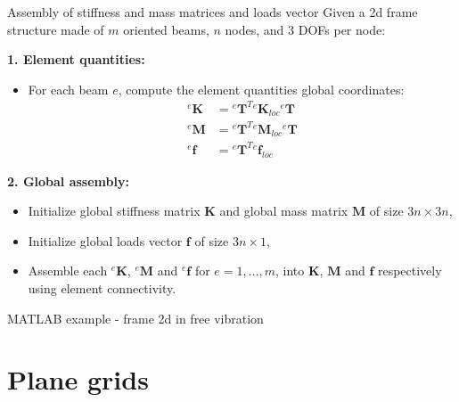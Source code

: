 \documentclass[aspectratio=169]{beamer}
\begin{document}
{
\color{white}
\begin{frame}{Assembly of stiffness and mass matrices and loads vector}
  Given a 2d frame structure made of $m$ oriented beams, $n$ nodes, and $3$ DOFs per node:

  \vspace{0.5em}
  \textbf{1. Element quantities:}
  \begin{itemize}
    \item For each beam $e$, compute the element quantities global coordinates:
          \begin{align*}
            {}^e\mathbf{K} & ={}^e\mathbf{T}^{T} {}^e\mathbf{K}_{loc}{}^e\mathbf{T} \\
            {}^e\mathbf{M} & ={}^e\mathbf{T}^{T} {}^e\mathbf{M}_{loc}{}^e\mathbf{T} \\
            {}^e\mathbf{f} & ={}^e\mathbf{T}^{T} {}^e\mathbf{f}_{loc}
          \end{align*}
  \end{itemize}

  \vspace{0.5em}
  \textbf{2. Global assembly:}
  \begin{itemize}
    \item Initialize global stiffness matrix $\mathbf{K}$ and global mass matrix $\mathbf{M}$ of size $3n \times 3n$,
    \item  Initialize global loads vector $\mathbf{f}$ of size $3n \times 1$,
    \item Assemble each ${}^e\mathbf{K}$, ${}^e\mathbf{M}$ and ${}^e\mathbf{f}$ for $e=1,\dots,m$, into $\mathbf{K}$, $\mathbf{M}$ and $\mathbf{f}$ respectively using element connectivity.
  \end{itemize}
\end{frame}
}

\begin{frame}{MATLAB example - frame 2d in free vibration}
  \begin{center}
    \href{https://drive.mathworks.com/sharing/6a9792ef-d0a7-4aca-a1d0-8b1862b0ac3b}{}
  \end{center}
\end{frame}

\section{Plane grids}
\end{document}
